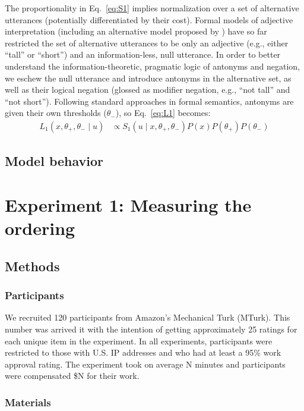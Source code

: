 \documentclass[10pt,letterpaper]{article}
\begin{document}
The proportionality in Eq.~\ref{eq:S1} implies normalization over a set of alternative utterances (potentially differentiated by their cost). 
Formal models of adjective interpretation (including an alternative model proposed by ) have so far restricted the set of alternative utterances to be only an adjective (e.g., either ``tall'' or ``short'') and an information-less, null utterance. 
In order to better understand the information-theoretic, pragmatic logic of antonyms and negation, we eschew the null utterance and introduce antonyms in the alternative set, as well as their logical negation (glossed as modifier negation, e.g., ``not tall'' and ``not short''). 
Following standard approaches in formal semantics, antonyms are given their own thresholds ($\theta_-$), so Eq.~\ref{eq:L1} becomes:
%
\begin{align}
L_{1}(x, \theta_+, \theta_- \mid u) &\propto S_{1}(u \mid x, \theta_+, \theta_-)  P(x)  P(\theta_+)  P(\theta_-) \label{eq:L1a}
\end{align}
\subsection{Model behavior}


\section{Experiment 1: Measuring the ordering}
\subsection{Methods}
\subsubsection{Participants}

We recruited 120 participants from Amazon's Mechanical Turk (MTurk). 
This number was arrived it with the intention of getting approximately 25 ratings for each unique item in the experiment.
In all experiments, participants were restricted to those with U.S. IP addresses and who had at least a 95\% work approval rating. 
The experiment took on average N minutes and participants were compensated \$N for their work.

\subsubsection{Materials}
\end{document}
